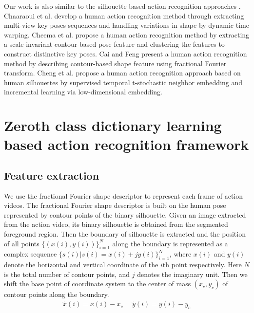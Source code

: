 \documentclass{article}
\begin{document}
Our work is also similar to the silhouette based action recognition approaches \cite{Chaaraoui2013,Cheema,frftacpr2015,ChengTIP2015}.
Chaaraoui et al. \cite{Chaaraoui2013} develop a human action recognition method through extracting multi-view key poses sequences and  handling variations in shape by dynamic time warping.
Cheema et al. \cite{Cheema}  propose a human action recognition method by extracting  a scale invariant contour-based pose feature  and  clustering  the features to construct distinctive key poses.
Cai and Feng \cite{frftacpr2015} present a human action recognition  method by describing contour-based shape feature using fractional Fourier transform.
Cheng  et al. \cite{ChengTIP2015} propose a human action recognition approach based on human silhouettes by supervised temporal t-stochastic neighbor embedding and incremental learning via low-dimensional embedding.



%
\section{Zeroth class dictionary learning based action recognition framework}

\subsection{Feature extraction}

We use the fractional Fourier shape descriptor \cite{frftacpr2015}  to represent each frame of action videos.
The fractional Fourier shape descriptor is built on the human pose represented by contour points of the binary silhouette.
Given an image extracted from the action video, its binary silhouette is obtained from the segmented foreground region.
Then the boundary of silhouette is extracted
 and the position of all points $\{(x(i),y(i))\}_{i=1}^{N}$ along the boundary is represented as a complex sequence $\{s(i)|s(i)=x(i)+jy(i)\}_{i=1}^{N}$, where $x(i)$ and $y(i)$ denote  the horizontal and vertical coordinate of the $i$th point respectively. Here $N$ is the total number of contour points, and $j$ denotes the imaginary unit.
Then we shift the base point of coordinate system to the center of mass $(x_{c},y_{c})$ of contour points along the boundary.
\begin{equation} \label{eq5}
 \begin{aligned}
\tilde{x}(i)=x(i)-x_{c} \ \ \ \ \ \  \tilde{y}(i)=y(i)-y_{c}
 \end{aligned}
\end{equation}
\end{document}
